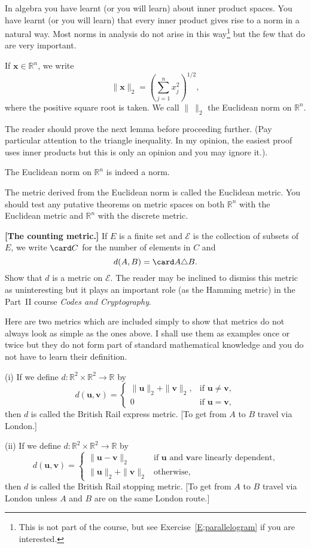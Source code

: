 In algebra you have learnt (or you will learn) about inner product
spaces. You have learnt (or you will learn) that every inner product
gives rise to a norm in a natural way. Most norms in analysis
do not arise in this way\footnote{This is not part of the
course, but see Exercise~\ref{E;parallelogram} if you are interested.}
but the few that do are very important.
\begin{definition} If ${\mathbf x}\in{\mathbb R}^{n}$, we write
\[\|{\mathbf x}\|_{2}=\left(\sum_{j=1}^{n}x_{j}^{2}\right)^{1/2},\]
where the positive square root is taken. We call $\|\ \|_{2}$
the Euclidean norm on ${\mathbb R}^{n}$.
\end{definition}
The reader should prove the next lemma before proceeding further.
(Pay particular attention to the triangle inequality.
In my opinion, the easiest proof uses inner products but
this is only an opinion and you may ignore it.).
\begin{lemma} The Euclidean norm on ${\mathbb R}^{n}$ is indeed a norm.
\end{lemma}
The metric derived from the Euclidean norm is called the Euclidean
metric. You should test any putative theorems on metric spaces
on both ${\mathbb R}^{n}$ with the Euclidean metric and 
${\mathbb R}^{n}$ with the discrete metric.
\begin{exercise}{\bf [The counting metric.]} If $E$ is a finite
set and ${\mathcal E}$ is the collection of subsets of $E$,
we write $\card C$ for the number of elements in $C$ and
\[d(A,B)=\card A\triangle B.\]
Show that $d$ is a metric on ${\mathcal E}$. The reader may be
inclined to dismiss this metric as uninteresting but it plays an
important role (as the Hamming metric) in the Part~II course
\emph{Codes and Cryptography}.
\end{exercise}
Here are two metrics which are included simply to show that
metrics do not always look as simple as the ones above.
I shall use them as examples once or twice but
they do not form part of standard mathematical knowledge
and you do not have to learn their definition.
\begin{definition}\label{D;British Rail} (i) If we define 
$d:{\mathbb R}^{2}\times{\mathbb R}^{2}\rightarrow{\mathbb R}$
by
\[
d({\mathbf u},{\mathbf v})=
\begin{cases}
\|{\mathbf u}\|_{2}+\|{\mathbf v}\|_{2},&
\text{if ${\mathbf u}\neq{\mathbf v}$},\\
0&\text{if ${\mathbf u}={\mathbf v}$,}
\end{cases}
\]
then $d$ is called the British Rail express metric. [To get from
$A$ to $B$ travel via London.]

(ii) If we define 
$d:{\mathbb R}^{2}\times{\mathbb R}^{2}\rightarrow{\mathbb R}$
by
\[
d({\mathbf u},{\mathbf v})=
\begin{cases}
\|{\mathbf u}-{\mathbf v}\|_{2}&\text{if ${\mathbf u}$ and ${\mathbf v}$
are linearly dependent,}\\
\|{\mathbf u}\|_{2}+\|{\mathbf v}\|_{2}&\text{otherwise,}
\end{cases}
\]
then $d$ is called the British Rail stopping metric. [To get from
$A$ to $B$ travel via London unless $A$ and $B$ are on the same London
route.] 
\end{definition}

